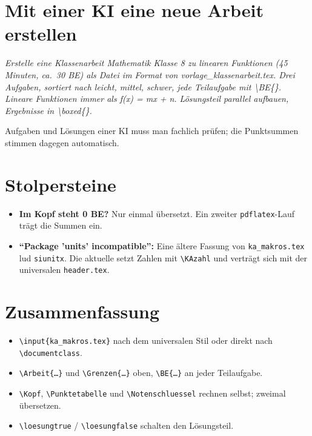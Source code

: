 \section{Mit einer KI eine neue Arbeit erstellen}

\begin{hinweis}
	\itshape Erstelle eine Klassenarbeit Mathematik Klasse 8 zu linearen Funktionen (45 Minuten, ca.\ 30 BE) als Datei im Format von vorlage\_klassenarbeit.tex. Drei Aufgaben, sortiert nach leicht, mittel, schwer, jede Teilaufgabe mit \textbackslash BE\{\}. Lineare Funktionen immer als f(x) = mx + n. Lösungsteil parallel aufbauen, Ergebnisse in \textbackslash boxed\{\}.
\end{hinweis}

Aufgaben und Lösungen einer KI muss man fachlich prüfen; die Punktsummen stimmen dagegen automatisch.



\section{Stolpersteine}

\begin{itemize}
	\item \textbf{Im Kopf steht 0 BE?} Nur einmal übersetzt. Ein zweiter \texttt{pdflatex}-Lauf trägt die Summen ein.
	\item \textbf{\enquote{Package 'units' incompatible}:} Eine ältere Fassung von \texttt{ka\_makros.tex} lud \texttt{siunitx}. Die aktuelle setzt Zahlen mit \texttt{\textbackslash KAzahl} und verträgt sich mit der universalen \texttt{header.tex}.
\end{itemize}



\section{Zusammenfassung}

\begin{itemize}
	\item \texttt{\textbackslash input\{ka\_makros.tex\}} nach dem universalen Stil oder direkt nach \texttt{\textbackslash documentclass}.
	\item \texttt{\textbackslash Arbeit\{\dots\}} und \texttt{\textbackslash Grenzen\{\dots\}} oben, \texttt{\textbackslash BE\{\dots\}} an jeder Teilaufgabe.
	\item \texttt{\textbackslash Kopf}, \texttt{\textbackslash Punktetabelle} und \texttt{\textbackslash Notenschluessel} rechnen selbst; zweimal übersetzen.
	\item \texttt{\textbackslash loesungtrue} / \texttt{\textbackslash loesungfalse} schalten den Lösungsteil.
\end{itemize}


